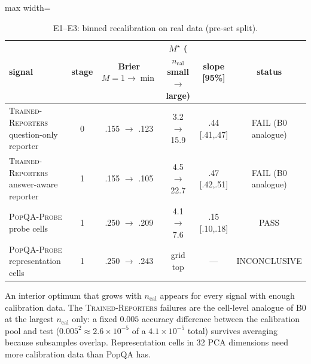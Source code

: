 \documentclass[twoside]{article}
\theoremstyle{definition}
\theoremstyle{remark}
\newcommand{\1}{\mathbf{1}}
\newcommand{\expname}[1]{\textsc{#1}}
\begin{document}
\begin{table}[t]
\caption{E1--E3: binned recalibration on real data (pre-set split).}
\centering\small
\begin{adjustbox}{max width=\textwidth}
\begin{tabular}{lccccc}
\toprule
signal & stage & Brier $M{=}1\to\min$ & $M^\star$ ($n_{\mathrm{cal}}$ small$\to$large) & slope [95\%] & status\\
\midrule
\expname{Trained-Reporters} question-only reporter & 0 & .155 $\to$ .123 & 3.2 $\to$ 15.9 & .44 [.41,.47] & FAIL (B0 analogue)\\
\expname{Trained-Reporters} answer-aware reporter  & 1 & .155 $\to$ .105 & 4.5 $\to$ 22.7 & .47 [.42,.51] & FAIL (B0 analogue)\\
\expname{PopQA-Probe} probe cells            & 1 & .250 $\to$ .209 & 4.1 $\to$ 7.6  & .15 [.10,.18] & PASS\\
\expname{PopQA-Probe} representation cells   & 1 & .250 $\to$ .243 & grid top       & ---           & INCONCLUSIVE\\
\bottomrule
\end{tabular}
\end{adjustbox}
\end{table}
An interior optimum that grows with $n_{\mathrm{cal}}$ appears for every signal with enough
calibration data. The \expname{Trained-Reporters} failures are the cell-level analogue of B0 at the largest
$n_{\mathrm{cal}}$ only: a fixed $0.005$ accuracy difference between the calibration pool and test
($0.005^2\approx2.6\times10^{-5}$ of a $4.1\times10^{-5}$ total) survives averaging because
subsamples overlap. Representation cells in 32 PCA dimensions need more calibration data than
PopQA has.
\end{document}
